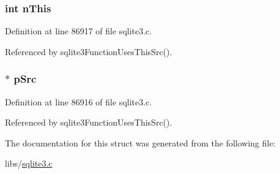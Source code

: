 \subsubsection[{n\+This}]{\setlength{\rightskip}{0pt plus 5cm}int n\+This}\label{struct_src_count_aa62d35615abd8d5434da7ba666ec913d}


Definition at line 86917 of file sqlite3.\+c.



Referenced by sqlite3\+Function\+Uses\+This\+Src().

\hypertarget{struct_src_count_a84a7e06ff4c94a96573b33b55a0e23cf}{}
\subsubsection[{p\+Src}]{$\ast$ p\+Src}\label{struct_src_count_a84a7e06ff4c94a96573b33b55a0e23cf}


Definition at line 86916 of file sqlite3.\+c.



Referenced by sqlite3\+Function\+Uses\+This\+Src().



The documentation for this struct was generated from the following file\+:\begin{DoxyCompactItemize}
\item 
libs/\hyperlink{sqlite3_8c}{sqlite3.\+c}\end{DoxyCompactItemize}

